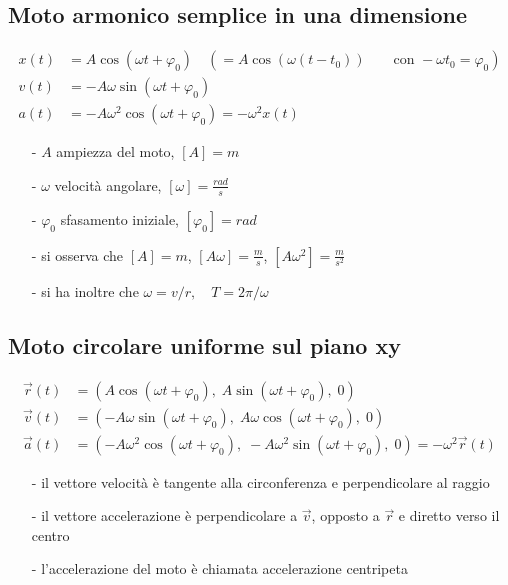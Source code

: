 \documentclass[a4paper]{article}
\begin{document}
\newpage

\subsection{Moto armonico semplice in una dimensione}
\begin{align*}
	x(t) &= A \cos (\omega t + \varphi_0) \quad (= A \cos (\omega (t - t_0)) \qquad \text{con } -\omega t_0 = \varphi_0) \\
	v(t) &= - A \omega \sin (\omega t + \varphi_0) \\
	a(t) &= -A \omega^2 \cos (\omega t + \varphi_0) = -\omega^2 x(t)
\end{align*}
\begin{itemize}[topsep=3pt, itemsep=0pt]
	\item[-] \(A\) ampiezza del moto, \(\left[A\right] = m\)
	\item[-] \(\omega\) velocità angolare, \(\left[\omega\right] = \frac{rad}{s}\)
	\item[-] \(\varphi_0\) sfasamento iniziale, \(\left[\varphi_0\right] = rad\)
	\item[-] si osserva che \(\left[A\right] = m\), \(\left[A\omega\right] = \frac{m}{s}\), \(\left[A\omega^2\right] = \frac{m}{s^2}\)
	\item[-] si ha inoltre che \(\omega = v/r, \quad T = 2\pi / \omega\)
\end{itemize}

\subsection{Moto circolare uniforme sul piano xy}
\begin{align*}
	\vec{r}(t) &= \left(A \cos (\omega t + \varphi_0), \; A \sin (\omega t + \varphi_0), \; 0\right) \\
	\vec{v}(t) &= \left(-A \omega \sin (\omega t + \varphi_0), \; A \omega \cos (\omega t + \varphi_0), \; 0 \right) \\
	\vec{a}(t) &= \left(-A \omega^2 \cos (\omega t + \varphi_0), \; -A \omega^2 \sin (\omega t + \varphi_0), \; 0 \right) = -\omega^2 \vec{r}(t)
\end{align*}
\begin{itemize}[topsep=3pt, itemsep=0pt]
	\item[-] il vettore velocità è tangente alla circonferenza e perpendicolare al raggio
	\item[-] il vettore accelerazione è perpendicolare a \(\vec{v}\), opposto a \(\vec{r}\) e diretto verso il centro
	\item[-] l'accelerazione del moto è chiamata accelerazione centripeta
\end{itemize}
\end{document}
